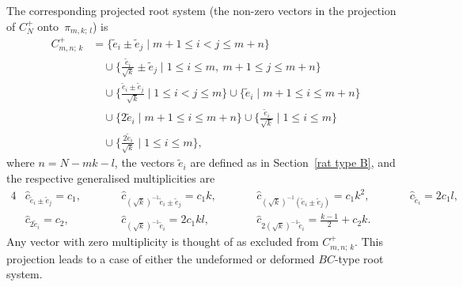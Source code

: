 \documentclass[12pt]{amsart}
\numberwithin{equation}{section}
\theoremstyle{definition}
\begin{document}
 

The corresponding projected root system (the non-zero vectors in the projection of $C_N^+$ onto~$\pi_{m,k; \, l}$) is 
\begin{align*}
    C^+_{m,n; \, k} &= \{ \widetilde{e}_i \pm \widetilde{e}_j \mid m+1 \leq i < j \leq m+n\} \\
    &\quad \cup \{\tfrac{\widetilde{e}_i}{\sqrt{k}} \pm \widetilde{e}_j \mid 1 \leq i \leq m, \ m+1 \leq j \leq m+n \}  
    \\
    &\quad \cup\{\tfrac{\widetilde{e}_i \pm \widetilde{e}_j}{\sqrt{k}} \mid 1 \leq i < j \leq m \} \cup 
    \{\widetilde{e}_i \mid m+1 \leq i \leq m+n \}
    \\
    &\quad \cup \{2\widetilde{e}_i \mid m+1 \leq i \leq m+n\} \cup \{\tfrac{\widetilde{e}_i}{\sqrt{k}} \mid 1 \leq i \leq m \} \\
    &\quad \cup \{\tfrac{2 \widetilde{e}_i}{\sqrt{k}} \mid 1 \leq i \leq m \},
\end{align*}
where $n = N - mk - l$, the vectors $\widetilde{e}_i$ are defined as in Section~\ref{rat type B}, and the respective generalised multiplicities are 
\begin{alignat*}{4}
    &\widehat{c}_{\widetilde{e}_i \pm \widetilde{e}_j} = c_1, \qquad 
    &&\widehat{c}_{(\sqrt{k})^{-1}\widetilde{e}_i \pm \widetilde{e}_j} = c_1 k, \qquad 
    &&\widehat{c}_{(\sqrt{k})^{-1}(\widetilde{e}_i \pm \widetilde{e}_j)} = c_1 k^2, \qquad 
    &&\widehat{c}_{\widetilde{e}_i} = 2c_1 l , \\
    &\widehat{c}_{2\widetilde{e}_i} = c_2, \qquad 
    &&\widehat{c}_{(\sqrt{k})^{-1}\widetilde{e}_i} = 2c_1 kl, \qquad
    &&\widehat{c}_{2(\sqrt{k})^{-1}\widetilde{e}_i} = \frac{k-1}{2} + c_2k. 
\end{alignat*}
Any vector with zero multiplicity is thought of as excluded from $C_{m,n; \, k}^+$.
This projection leads to a case of either the undeformed or deformed $BC$-type root system. 
\end{document}
